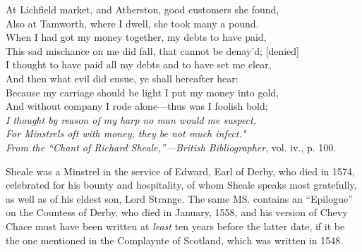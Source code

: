 \begin{scverse}
At Lichfield market, and Atherston, good customers she found,\\
Also at Tamworth, where I dwell, she took many a pound.\\
When I had got my money together, my debts to have paid,\\
This sad mischance on me did fall, that cannot be denay’d; [denied]\\
I thought to have paid all my debts and to have set me clear,\\
And then what evil did ensue, ye shall hereafter hear:\\
Because my carriage should be light I put my money into gold,\\
And without company I rode alone—thus was I foolish bold;\\
\textit{I thought by reason of my harp no man would me suspect,\\
For Minstrels oft with money, they be not much infect."\\
\hfill From the “Chant of Richard Sheale,”—British Bibliographer}, vol. iv., p. 100.
\end{scverse}
\pagebreak

Sheale was a Minstrel in the service of Edward, Earl of Derby, who died in
1574, celebrated for his bounty and hospitality, of whom Sheale speaks most
gratefully, as well as of his eldest son, Lord Strange. The same MS. contains an
“Epilogue” on the Countess of Derby, who died in January, 1558, and his
version of Chevy Chace must have been written at \textit{least} ten years before the
latter date, if it be the one mentioned in the Complaynte of Scotland, which was
written in 1548.

